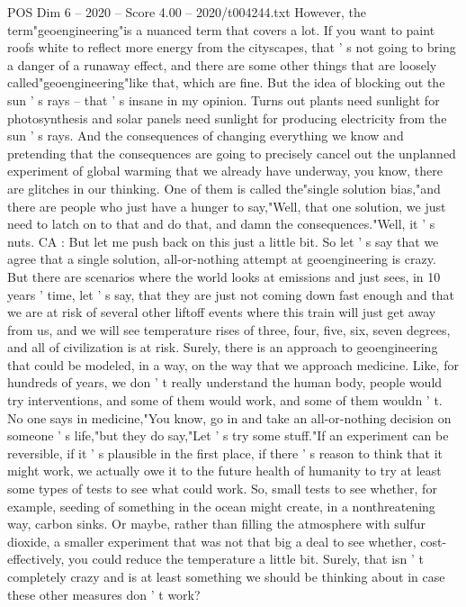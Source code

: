 \begin{textsample}{POS Dim 6 – 2020 – Score 4.00 – 2020/t004244.txt}
However, the term"geoengineering"is a nuanced term that covers a lot.
If you want to paint roofs white to reflect more energy from the cityscapes, that ' s not going to bring a danger of a runaway effect, and there are some other things that are loosely called"geoengineering"like that, which are fine.
But the idea of blocking out the sun ' s rays -- that ' s insane in my opinion.
Turns out plants need sunlight for photosynthesis and solar panels need sunlight for producing electricity from the sun ' s rays.
And the consequences of changing everything we know and pretending that the consequences are going to precisely cancel out the unplanned experiment of global warming that we already have underway, you know, there are glitches in our thinking.
One of them is called the"single solution bias,"and there are people who just have a hunger to say,"Well, that one solution, we just need to latch on to that and do that, and damn the consequences."Well, it ' s nuts.
CA : But let me push back on this just a little bit.
So let ' s say that we agree that a single solution, all-or-nothing attempt at geoengineering is crazy.
But there are scenarios where the world looks at emissions and just sees, in 10 years ' time, let ' s say, that they are just not coming down fast enough and that we are at risk of several other liftoff events where this train will just get away from us, and we will see temperature rises of three, four, five, six, seven degrees, and all of civilization is at risk.
Surely, there is an approach to geoengineering that could be modeled, in a way, on the way that we approach medicine.
Like, for hundreds of years, we don ' t really understand the human body, people would try interventions, and some of them would work, and some of them wouldn ' t.
No one says in medicine,"You know, go in and take an all-or-nothing decision on someone ' s life,"but they do say,"Let ' s try some stuff."If an experiment can be reversible, if it ' s plausible in the first place, if there ' s reason to think that it might work, we actually owe it to the future health of humanity to try at least some types of tests to see what could work.
So, small tests to see whether, for example, seeding of something in the ocean might create, in a nonthreatening way, carbon sinks.
Or maybe, rather than filling the atmosphere with sulfur dioxide, a smaller experiment that was not that big a deal to see whether, cost-effectively, you could reduce the temperature a little bit.
Surely, that isn ' t completely crazy and is at least something we should be thinking about in case these other measures don ' t work?

\end{textsample}
